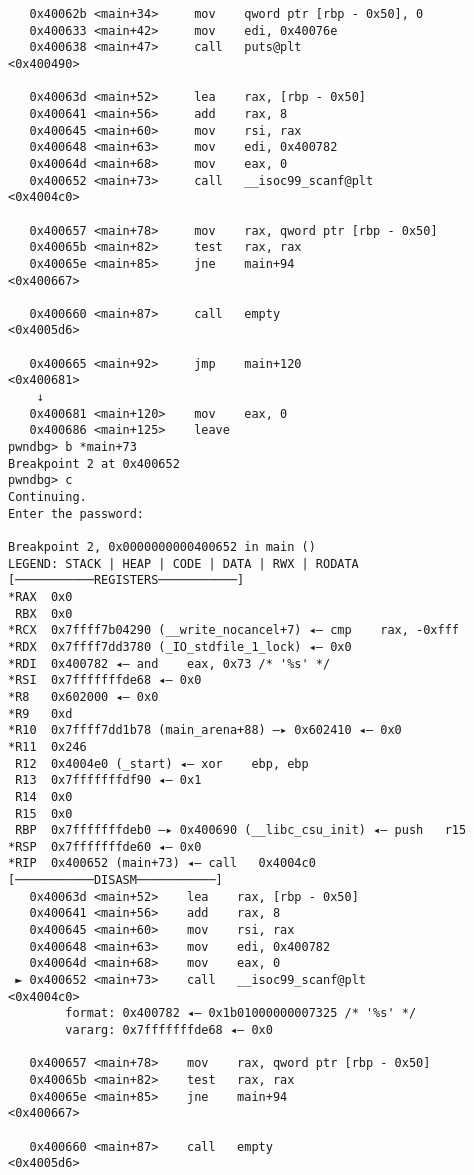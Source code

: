 \documentclass{article}
\begin{document}
\begin{lstlisting}
   0x40062b <main+34>     mov    qword ptr [rbp - 0x50], 0
   0x400633 <main+42>     mov    edi, 0x40076e
   0x400638 <main+47>     call   puts@plt                      <0x400490>
 
   0x40063d <main+52>     lea    rax, [rbp - 0x50]
   0x400641 <main+56>     add    rax, 8
   0x400645 <main+60>     mov    rsi, rax
   0x400648 <main+63>     mov    edi, 0x400782
   0x40064d <main+68>     mov    eax, 0
   0x400652 <main+73>     call   __isoc99_scanf@plt            <0x4004c0>
 
   0x400657 <main+78>     mov    rax, qword ptr [rbp - 0x50]
   0x40065b <main+82>     test   rax, rax
   0x40065e <main+85>     jne    main+94                       <0x400667>
 
   0x400660 <main+87>     call   empty                         <0x4005d6>
 
   0x400665 <main+92>     jmp    main+120                      <0x400681>
    ↓
   0x400681 <main+120>    mov    eax, 0
   0x400686 <main+125>    leave  
pwndbg> b *main+73
Breakpoint 2 at 0x400652
pwndbg> c
Continuing.
Enter the password:

Breakpoint 2, 0x0000000000400652 in main ()
LEGEND: STACK | HEAP | CODE | DATA | RWX | RODATA
[───────────REGISTERS───────────]
*RAX  0x0
 RBX  0x0
*RCX  0x7ffff7b04290 (__write_nocancel+7) ◂— cmp    rax, -0xfff
*RDX  0x7ffff7dd3780 (_IO_stdfile_1_lock) ◂— 0x0
*RDI  0x400782 ◂— and    eax, 0x73 /* '%s' */
*RSI  0x7fffffffde68 ◂— 0x0
*R8   0x602000 ◂— 0x0
*R9   0xd
*R10  0x7ffff7dd1b78 (main_arena+88) —▸ 0x602410 ◂— 0x0
*R11  0x246
 R12  0x4004e0 (_start) ◂— xor    ebp, ebp
 R13  0x7fffffffdf90 ◂— 0x1
 R14  0x0
 R15  0x0
 RBP  0x7fffffffdeb0 —▸ 0x400690 (__libc_csu_init) ◂— push   r15
*RSP  0x7fffffffde60 ◂— 0x0
*RIP  0x400652 (main+73) ◂— call   0x4004c0
[───────────DISASM───────────]
   0x40063d <main+52>    lea    rax, [rbp - 0x50]
   0x400641 <main+56>    add    rax, 8
   0x400645 <main+60>    mov    rsi, rax
   0x400648 <main+63>    mov    edi, 0x400782
   0x40064d <main+68>    mov    eax, 0
 ► 0x400652 <main+73>    call   __isoc99_scanf@plt            <0x4004c0>
        format: 0x400782 ◂— 0x1b01000000007325 /* '%s' */
        vararg: 0x7fffffffde68 ◂— 0x0
 
   0x400657 <main+78>    mov    rax, qword ptr [rbp - 0x50]
   0x40065b <main+82>    test   rax, rax
   0x40065e <main+85>    jne    main+94                       <0x400667>
 
   0x400660 <main+87>    call   empty                         <0x4005d6>
 

\end{lstlisting}
\end{document}
